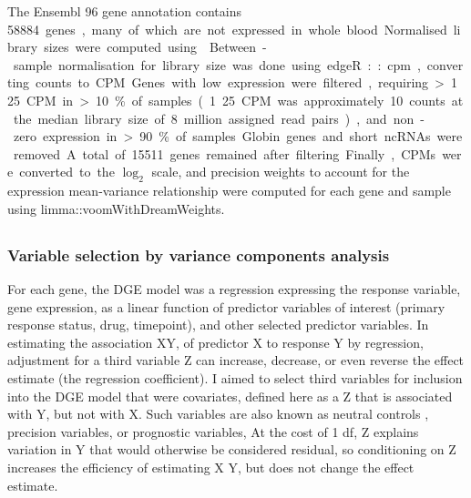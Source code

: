 The Ensembl 96 gene annotation contains \SI{58884} genes, many of which are not expressed in whole blood.
Normalised library sizes were computed using .
Between-sample normalisation for library size was done using edgeR::cpm, converting counts to \gls{CPM}.
Genes with low expression were filtered,
requiring >1.25 CPM in >10\% of samples (1.25 CPM was approximately 10 counts at the median library size of 8 million assigned read pairs),
and non-zero expression in >90\% of samples.
Globin genes and short ncRNAs were removed.
A total of 15511 genes remained after filtering.
Finally, \glspl{CPM} were converted to the $\log_{2}$ scale, and precision weights to account for the expression mean-variance relationship were computed for each gene and sample using limma::voomWithDreamWeights.

\subsection{}

\subsubsection{Variable selection by variance components analysis}
\label{subsubsec:multiPANTS_var_selection}

For each gene, the \gls{DGE} model was a regression expressing the response variable, gene expression, 
as a linear function of predictor variables of interest (primary response status, drug, timepoint),
and other selected predictor variables.
In estimating the association X\textrightarrow Y, of predictor X to response Y by regression, 
adjustment for a third variable Z can increase, decrease, or even reverse the effect estimate (the regression coefficient).
I aimed to select third variables for inclusion into the \gls{DGE} model that were covariates,
defined here as a Z that is associated with Y, but not with X.
Such variables are also known as neutral controls \autocite{cinelli2020CrashCourseGood}, precision variables, or prognostic variables,
At the cost of 1 \gls{df},
Z explains variation in Y that would otherwise be considered residual,
so conditioning on Z increases the efficiency of estimating X \textrightarrow Y, but does not change the effect estimate.

